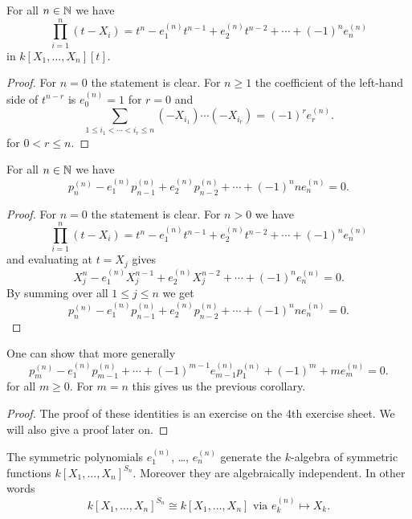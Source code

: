 \begin{lem}
 For all $n \in \mathbb{N}$ we have
 \[
  \prod_{i=1}^n (t-X_i) = t^n - e^{(n)}_1 t^{n-1} + e^{(n)}_2 t^{n-2} + \dotsb + (-1)^n e^{(n)}_n
 \]
 in $k[X_1, \dotsc, X_n][t]$.
\end{lem}
\begin{proof}
 For $n = 0$ the statement is clear. For $n \geq 1$ the coefficient of the left-hand side of $t^{n-r}$ is $e^{(n)}_0 = 1$ for $r = 0$ and
 \[
  \sum_{1 \leq i_1 < \dotsb < i_r \leq n} (-X_{i_1}) \dotsm (-X_{i_r}) = (-1)^r e^{(n)}_r.
 \]
 for $0 < r \leq n$.
\end{proof}


\begin{cor}
 For all $n \in \mathbb{N}$ we have
 \[
  p^{(n)}_n - e^{(n)}_1 p^{(n)}_{n-1} + e^{(n)}_2 p^{(n)}_{n-2} + \dotsb + (-1)^n n e^{(n)}_n = 0.
 \]
\end{cor}
\begin{proof}
 For $n = 0$ the statement is clear. For $n > 0$ we have
 \[
  \prod_{i=1}^n (t-X_i) = t^n - e^{(n)}_1 t^{n-1} + e^{(n)}_2 t^{n-2} + \dotsb + (-1)^n e^{(n)}_n
 \]
 and evaluating at $t = X_j$ gives
 \[
  X_j^n - e^{(n)}_1 X_j^{n-1} + e^{(n)}_2 X_j^{n-2} + \dotsb + (-1)^n e^{(n)}_n = 0.
 \]
 By summing over all $1 \leq j \leq n$ we get
 \[
  p^{(n)}_n - e^{(n)}_1 p^{(n)}_{n-1} + e^{(n)}_2 p^{(n)}_{n-2} + \dotsb + (-1)^n n e^{(n)}_n = 0.
 \]
\end{proof}


\begin{rem}
 One can show that more generally
 \[
  p^{(n)}_m - e^{(n)}_1 p^{(n)}_{m-1} + \dotsb + (-1)^{m-1} e^{(n)}_{m-1} p^{(n)}_1 + (-1)^m+ m e^{(n)}_m = 0.
 \]
 for all $m \geq 0$. For $m = n$ this gives us the previous corollary.
\end{rem}
\begin{proof}
 The proof of these identities is an exercise on the 4th exercise sheet. We will also give a proof later on.
\end{proof}


\begin{thrm}
 The symmetric polynomials $e^{(n)}_1$, \dots, $e^{(n)}_n$ generate the $k$-algebra of symmetric functions $k[X_1, \dotsc, X_n]^{S_n}$. Moreover they are algebraically independent. In other words
 \[
  k[X_1, \dotsc, X_n]^{S_n} \cong k[X_1, \dotsc, X_n] \text{ via } e^{(n)}_k \mapsto X_k.
 \]
\end{thrm}


